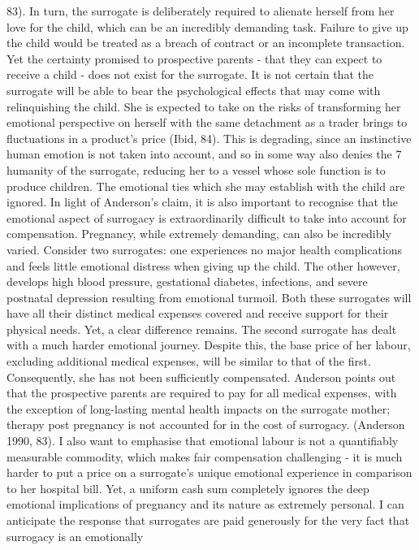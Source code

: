 83). In turn, the surrogate is deliberately required to alienate herself
from her love for the child, which can be an incredibly demanding task.
Failure to give up the child would be treated as a breach of contract or
an incomplete transaction. Yet the certainty promised to prospective
parents - that they can expect to receive a child - does not exist for
the surrogate. It is not certain that the surrogate will be able to bear
the psychological effects that may come with relinquishing the child.
She is expected to take on the risks of transforming her emotional
perspective on herself with the same detachment as a trader brings to
fluctuations in a product's price (Ibid, 84). This is degrading, since
an instinctive human emotion is not taken into account, and so in some
way also denies the 7 humanity of the surrogate, reducing her to a
vessel whose sole function is to produce children. The emotional ties
which she may establish with the child are ignored. In light of
Anderson's claim, it is also important to recognise that the emotional
aspect of surrogacy is extraordinarily difficult to take into account
for compensation. Pregnancy, while extremely demanding, can also be
incredibly varied. Consider two surrogates: one experiences no major
health complications and feels little emotional distress when giving up
the child. The other however, develops high blood pressure, gestational
diabetes, infections, and severe postnatal depression resulting from
emotional turmoil. Both these surrogates will have all their distinct
medical expenses covered and receive support for their physical needs.
Yet, a clear difference remains. The second surrogate has dealt with a
much harder emotional journey. Despite this, the base price of her
labour, excluding additional medical expenses, will be similar to that
of the first. Consequently, she has not been sufficiently compensated.
Anderson points out that the prospective parents are required to pay for
all medical expenses, with the exception of long-lasting mental health
impacts on the surrogate mother; therapy post pregnancy is not accounted
for in the cost of surrogacy. (Anderson 1990, 83). I also want to
emphasise that emotional labour is not a quantifiably measurable
commodity, which makes fair compensation challenging - it is much harder
to put a price on a surrogate's unique emotional experience in
comparison to her hospital bill. Yet, a uniform cash sum completely
ignores the deep emotional implications of pregnancy and its nature as
extremely personal. I can anticipate the response that surrogates are
paid generously for the very fact that surrogacy is an emotionally
